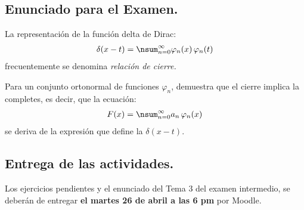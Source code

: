 \subsection{Enunciado para el Examen.}

La representación de la función delta de Dirac:
\begin{align*}
\delta (x - t) = \nsum_{n=0}^{\infty} \varphi_{n} (x) \, \varphi_{n} (t)
\end{align*}
frecuentemente se denomina \emph{relación de cierre.}
\par
Para un conjunto ortonormal de funciones $\varphi_{n}$, demuestra que el cierre implica la completes, es decir, que la ecuación:
\begin{align*}
F (x) = \nsum_{n=0}^{\infty} a_{n} \, \varphi_{n} (x)
\end{align*}
se deriva de la expresión que define la $\delta (x - t)$.

\subsection{Entrega de las actividades.}

Los ejercicios pendientes y el enunciado del Tema 3 del examen intermedio, se deberán de entregar \textbf{el martes 26 de abril a las 6 pm} por Moodle.

